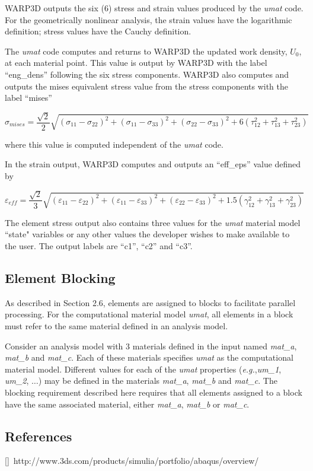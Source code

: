 \documentclass[11pt]{report}
\numberwithin{equation}{section}
\newcommand{\eg}{\emph{e.g.},\xspace}
\newcommand{\ti}{\emph}
\newcommand{\veps}{\varepsilon}
\newcommand{\umat}{\ti{umat}\xspace}
\newcounter{sect

s}
\begin{document}
WARP3D outputs the six (6) stress and strain values produced by the
\umat code. For the geometrically nonlinear
analysis, the strain values have the logarithmic definition;
stress values have the Cauchy definition.

The \umat code computes and returns to WARP3D the
updated work density, $U_0$, at each material point. This value is 
output by WARP3D with the label  ``eng\_dens''  following the
six stress components. WARP3D also computes and outputs the 
mises equivalent stress value from the stress components with the
label ``mises''

\begin{equation}
\sigma_{mises}= \frac {\sqrt{2}}{2}
\sqrt{ (\sigma_{11}-\sigma_{22})^2  +
(\sigma_{11}-\sigma_{33})^2  +
(\sigma_{22}-\sigma_{33})^2  + 6 ( \tau^2_{12} +
 \tau^2_{13} + \tau^2_{23} ) }
\end{equation}

\noindent where this value is computed independent of the \umat code.

In the strain output, WARP3D computes and outputs an ``eff\_eps''
value defined by

\begin{equation}
\veps_{eff}= \frac {\sqrt{2}}{3}
\sqrt{ (\veps_{11}-\veps_{22})^2  +
(\veps_{11}-\veps_{33})^2  +
(\veps_{22}-\veps_{33})^2  + 1.5 ( \gamma^2_{12} +
 \gamma^2_{13} + \gamma^2_{23} ) }
\end{equation}


\noindent The element stress output also contains three values for the \umat 
material model ``state" variables or any other values the
developer wishes to make available to the user. The output labels
are ``c1'', ``c2'' and ``c3''.

\subsection {Element Blocking}
As described in Section 2.6, elements are assigned to blocks
to facilitate parallel processing. For the computational material model \umat,
all elements in a block must refer to the same material defined
in an analysis model.

Consider an analysis model with 3 materials defined in the input
named \ti{mat\_a}, \ti{mat\_b} and \ti{mat\_c}. Each of these materials specifies
\umat as the computational material model. Different values for each of the
\umat properties (\eg \ti{um\_1}, \ti{um\_2}, $\dots$) may be defined in the materials
\ti{mat\_a}, \ti{mat\_b} and \ti{mat\_c}. The blocking requirement
described here requires that all elements assigned to a block have the same
associated material, either  \ti{mat\_a}, \ti{mat\_b} or \ti{mat\_c}.

\subsection {References}
\small
[\label {R:FA1965}\thesectrefs]~http://www.3ds.com/products/simulia/portfolio/abaqus/overview/
\end{document}
